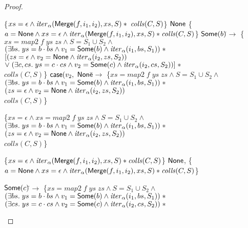 \begin{proof}
\begin{itemize}
\begin{specification}
\nextline \> \{$xs = \epsilon \land \mathit{iter}_\alpha(\mathsf{Merge}(f, i_1, i_2), xs, S)
               * \; \mathit{colls}(C,S)$\}
\nextline \> $\mathsf{None}$ 
\nextline \> \{$a = \mathsf{None} \land xs = \epsilon \land \mathit{iter}_\alpha(\mathsf{Merge}(f, i_1, i_2), xs, S)
               * \mathit{colls}(C,S) $\}
\nextline \;\;\;$\mathsf{Some}(b)$\=$ \to $ 
\nextline \> \{$xs = \mathit{map2}\;f\;ys\;zs \land 
                  S = S_1 \cup S_2 \land$ 
\\ \> \>\;\;    $(\exists bs.\; ys = b\cdot bs \land v_1 = \mathsf{Some}(b) \land 
                                \mathit{iter}_\alpha(i_1, bs, S_1)) \;*$ 
\\ \> \>\;     $[(zs = \epsilon \land v_2 = \mathsf{None} \land \mathit{iter}_\alpha(i_2, zs, S_2))$ 
\\ \> \>\;\;    $\vee\; (\exists c, cs.\; ys = c\cdot cs \land v_2 = \mathsf{Some}(c) \land 
                                \mathit{iter}_\alpha(i_2, cs, S_2))] \;*$ 
\\ \> \>\;     $\mathit{colls}(C,S)$\}
\nextline \> $\mathsf{case}(v_2,$ 
\nextline \> \;\;\; $\mathsf{None}$\=$\to$ 
\nextline \> \> \{$xs = \mathit{map2}\;f\;ys\;zs \land 
                  S = S_1 \cup S_2 \land$ 
\\ \> \> \>\;\;    $(\exists bs.\; ys = b\cdot bs \land v_1 = \mathsf{Some}(b) \land 
                                \mathit{iter}_\alpha(i_1, bs, S_1)) \;*$
\\ \> \> \>\;     $(zs = \epsilon \land v_2 = \mathsf{None} \land \mathit{iter}_\alpha(i_2, zs, S_2))$ 
\\ \> \> \>\;     $\mathit{colls}(C,S)$\}

\nextline \> \> \{$xs = \epsilon \land xs = \mathit{map2}\;f\;ys\;zs \land 
                  S = S_1 \cup S_2 \land$ 
\\ \> \> \>\;\;    $(\exists bs.\; ys = b\cdot bs \land v_1 = \mathsf{Some}(b) \land 
                                \mathit{iter}_\alpha(i_1, bs, S_1)) \;*$
\\ \> \> \>\;     $(zs = \epsilon \land v_2 = \mathsf{None} \land \mathit{iter}_\alpha(i_2, zs, S_2))$ 
\\ \> \> \>\;     $\mathit{colls}(C,S)$\}

\nextline \> \> \{$xs = \epsilon \land \mathit{iter}_\alpha(\mathsf{Merge}(f, i_1, i_2), xs, S) * 
                   \mathit{colls}(C,S)$\}
\nextline \> \> $\mathsf{None}$,
\nextline \> \> \{$a = \mathsf{None} \land xs = \epsilon \land \mathit{iter}_\alpha(\mathsf{Merge}(f, i_1, i_2), xs, S) * 
                   \mathit{colls}(C,S)$\}

\nextline \> \;\;\; $\mathsf{Some}(c)$\=$ \to $ 
\nextline \> \> \{$xs = \mathit{map2}\;f\;ys\;zs \land 
                  S = S_1 \cup S_2 \land$ 
\\ \> \> \>\;\;    $(\exists bs.\; ys = b\cdot bs \land v_1 = \mathsf{Some}(b) \land 
                                \mathit{iter}_\alpha(i_1, bs, S_1)) \;*$
\\ \> \> \>\;\;    $(\exists cs.\; ys = c\cdot cs \land v_2 = \mathsf{Some}(c) \land 
                                \mathit{iter}_\alpha(i_2, cs, S_2)) \;*$


\end{specification}
\end{itemize}
\end{proof}
